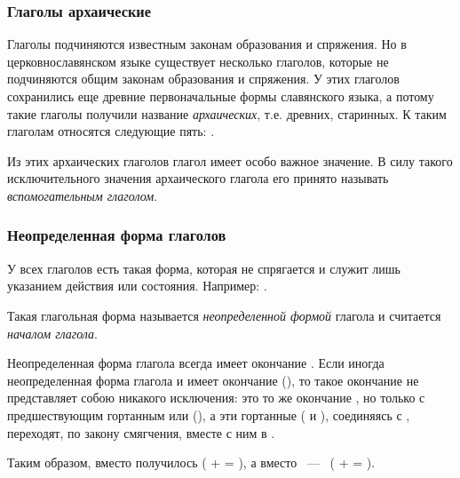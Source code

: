 \documentclass[11pt,a4paper,oneside]{memoir}
\begin{document}
    \bigskip{}


                \subsubsection{Глаголы архаические}

    Глаголы подчиняются известным законам образования и спряжения. Но в церковнославянском языке существует несколько глаголов, которые не подчиняются общим законам образования и спряжения. У этих глаголов сохранились еще древние первоначальные формы славянского языка, а потому такие глаголы получили название \emph{архаических}, т.е. древних, старинных. К таким глаголам относятся следующие пять: {}.
    
    Из этих архаических глаголов глагол {} имеет особо важное значение. В силу такого исключительного значения архаического глагола {} его принято называть \emph{вспомогательным глаголом}.

                \subsubsection{Неопределенная форма глаголов}

    У всех глаголов есть такая форма, которая не спрягается и служит лишь указанием действия или состояния. Например: {}.
    
    Такая глагольная форма называется \emph{неопределенной формой} глагола и считается \emph{началом глагола}.
    
    Неопределенная форма глагола всегда имеет окончание {}. Если иногда неопределенная форма глагола и имеет окончание {} ({}), то такое окончание не представляет собою никакого исключения: это то же окончание {}, но только с предшествующим гортанным {} или {} ({}), а эти гортанные ({} и {}), соединяясь с {}, переходят, по закону смягчения, вместе с ним в {}.
    
    Таким образом, вместо {} получилось {} ({} + {} = {}), а вместо {}~---~{} ({} + {} = {}).
    
\end{document}
